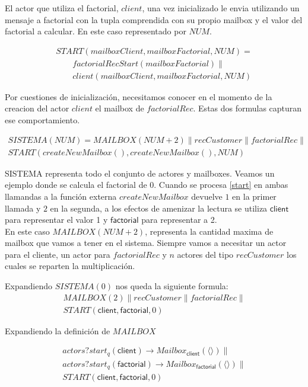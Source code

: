 \documentclass[fleqn]{article}
\newcommand{\myList}[1]{\langle #1 \rangle}
\begin{document}
El actor que utiliza el factorial, $client$, una vez inicializado le envia
utilizando un mensaje a factorial con la tupla comprendida con su propio mailbox
y el valor del factorial a calcular. En este caso representado por $NUM$.

\begin{gather*}
  START(mailboxClient, mailboxFactorial, NUM) = \\
  \qquad factorialRecStart(mailboxFactorial) \parallel \\
  \qquad client(mailboxClient, mailboxFactorial, NUM) 
\end{gather*}

Por cuestiones de inicialización, necesitamos conocer en el momento de la creacion del actor $client$ el mailbox de $factorialRec$. Estas dos formulas capturan ese comportamiento.

\begin{gather*}
  SISTEMA(NUM) = MAILBOX(NUM+2) \parallel
  recCustomer \parallel
  factorialRec \parallel \\
  START(createNewMailbox(), createNewMailbox(), NUM) \label{start}
\end{gather*}

\newcommand{\mbc}[0]{\mathsf{client}}
\newcommand{\mbf}[0]{\mathsf{factorial}}

SISTEMA representa todo el conjunto de actores y mailboxes. Veamos un ejemplo
donde se calcula el factorial de 0. Cuando se procesa \ref{start} en ambas llamandas a la función
externa $createNewMailbox$ devuelve $1$ en la primer
llamada y $2$ en la segunda, a los efectos de amenizar la lectura se utiliza
$\mbc$ para representar el valor 1 y $\mbf$ para representar a 2. \\

En este caso $MAILBOX(NUM + 2)$, representa la cantidad maxima de mailbox que
vamos a tener en el sistema. Siempre vamos a necesitar un actor para el cliente,
un actor para $factorialRec$ y $n$ actores del tipo $recCustomer$ los cuales se
reparten la multiplicación.

Expandiendo $SISTEMA(0)$ nos queda la siguiente formula:
\begin{gather*}
MAILBOX(2) \parallel
  recCustomer \parallel
  factorialRec \parallel \\
  START(\mbc, \mbf, 0)
\end{gather*}

Expandiendo la definición de $MAILBOX$

\begin{gather*}
actors?start_q(\mbc) \rightarrow Mailbox_\mbc(\myList{}) \parallel \\
actors?start_q(\mbf) \rightarrow Mailbox_\mbf(\myList{}) \parallel \\
START(\mbc, \mbf, 0)
\end{gather*}
\end{document}
